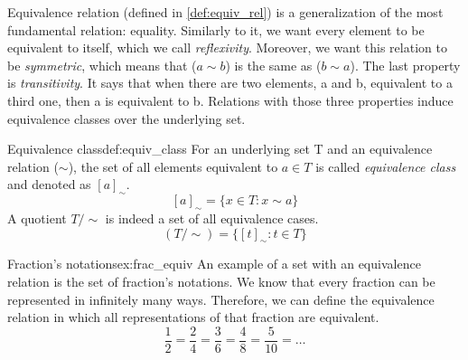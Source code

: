 Equivalence relation (defined in \ref{def:equiv_rel}) is a generalization of the most fundamental relation: equality. Similarly to it, we want every element to be equivalent to itself, which we call \emph{reflexivity}. Moreover, we want this relation to be \emph{symmetric}, which means that ($a \sim b$) is the same as ($b \sim a$). The last property is \emph{transitivity}. It says that when there are two elements, a and b, equivalent to a third one, then a is equivalent to b. Relations with those three properties induce equivalence classes \cite{AbstractAlgebra} over the underlying set.

\begin{defi}{Equivalence class}{def:equiv_class}
For an underlying set T and an equivalence relation ($\sim$), the set of all elements equivalent to $a \in T$ is called \emph{equivalence class} and denoted as $[a]_\sim$.
$$ [a]_\sim = \{x \in T : x \sim a \}$$
A quotient $T / \sim$ is indeed a set of all equivalence cases. 
$$ (T / \sim) = \{[t]_\sim : t \in T\}$$
\end{defi}

\begin{example}{Fraction's notations}{ex:frac_equiv}
An example of a set with an equivalence relation is the set of fraction's notations. We know that every fraction can be represented in infinitely many ways. Therefore, we can define the equivalence relation in which all representations of that fraction are equivalent.
$$ \frac{1}{2} = \frac{2}{4} = \frac{3}{6} = \frac{4}{8} = \frac{5}{10} = \dots$$
\end{example}

